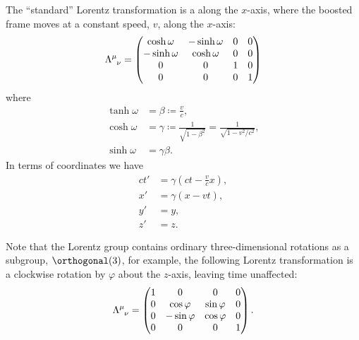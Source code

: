 \documentclass[fleqn]{NotesClass}
\begin{document}
\begin{appendices}
        The \enquote{standard} Lorentz transformation is a  along the \(x\)-axis, where the boosted frame moves at a constant speed, \(v\), along the \(x\)-axis:
        \begin{equation}
            \tensor{\Lambda}{^\mu_\nu} = 
            \begin{pmatrix}
                \cosh \omega & -\sinh \omega & 0 & 0\\
                -\sinh \omega & \cosh \omega & 0 & 0\\
                0 & 0 & 1 & 0\\
                0 & 0 & 0 & 1
            \end{pmatrix}
        \end{equation}
        where
        \begin{align}
            \tanh \omega &= \beta \coloneqq \frac{v}{c},\\
            \cosh \omega &= \gamma \coloneqq \frac{1}{\sqrt{1 - \beta^2}} = \frac{1}{\sqrt{1 - v^2/c^2}},\\
            \sinh \omega &= \gamma\beta.
        \end{align}
        In terms of coordinates we have
        \begin{align}
            ct' &= \gamma\left( ct -  \frac{v}{c}x \right),\\
            x' &= \gamma(x - vt),\\
            y' &= y,\\
            z' &= z.
        \end{align}
        
        Note that the Lorentz group contains ordinary three-dimensional rotations as a subgroup, \(\orthogonal(3)\), for example, the following Lorentz transformation is a clockwise rotation by \(\varphi\) about the \(z\)-axis, leaving time unaffected:
        \begin{equation}
            \tensor{\Lambda}{^\mu_\nu} = 
            \begin{pmatrix}
                1 & 0 & 0 & 0\\
                0 & \cos\varphi & \sin\varphi & 0\\
                0 & -\sin\varphi & \cos\varphi & 0\\
                0 & 0 & 0 & 1
            \end{pmatrix}
            .
        \end{equation}
        

\end{appendices}
\end{document}
